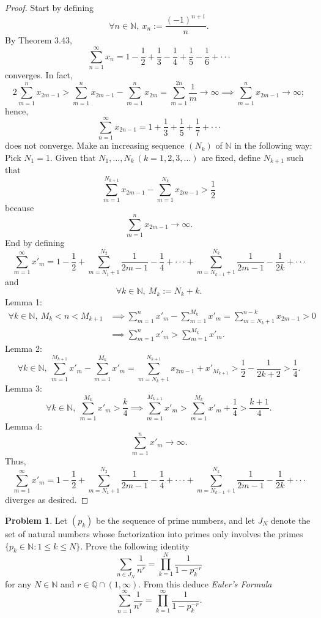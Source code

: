 \documentclass{amsart}
\theoremstyle{definition}
\newtheorem{problem}{Problem}
\begin{document}
\begin{proof}
    Start by defining 
    \[
    \forall n \in \mathbb{N}, \ x_n := \frac{(-1)^{n+1}}{n}.
    \]
    By Theorem 3.43,
    \[
    \sum_{n = 1}^{\infty}x_n = 1 - \frac{1}{2} + \frac{1}{3} - \frac{1}{4} + \frac{1}{5} - \frac{1}{6} + \cdot \cdot \cdot
    \]
    converges. In fact, 
    \[
    2\sum_{m = 1}^{n}x_{2m-1} > \sum_{m = 1}^{n}x_{2m-1} - \sum_{m = 1}^{n}x_{2m} = \sum_{m = 1}^{2n}\frac{1}{m} \to \infty \implies \sum_{m = 1}^{n}x_{2m-1} \to \infty;
    \]
    hence,
    \[
    \sum_{n = 1}^{\infty}x_{2n-1} = 1 + \frac{1}{3} + \frac{1}{5} + \frac{1}{7} + \cdot \cdot \cdot 
    \]
    does not converge. Make an increasing sequence $(N_k)$ of $\mathbb{N}$ in the following way: Pick $N_1 = 1$. Given that $N_1,...,N_k \ (k = 1,2,3,...)$ are fixed, define $N_{k+1}$ such that 
    \[
    \sum_{m = 1}^{N_{k+1}}x_{2m-1} - \sum_{m = 1}^{N_k}x_{2m-1} > \frac{1}{2}
    \]
    because
    \[
    \sum_{m = 1}^{n}x_{2m-1} \to \infty.
    \]
    End by defining
    \[
    \sum_{m = 1}^{\infty}x'_m = 1 - \frac{1}{2} + \sum_{m = N_1 + 1}^{N_2}\frac{1}{2m-1} - \frac{1}{4} + \cdot \cdot \cdot + \sum_{m = N_{k-1} + 1}^{N_k}\frac{1}{2m-1} - \frac{1}{2k} + \cdot \cdot \cdot
    \]
    and 
    \[
    \forall k \in \mathbb{N}, \ M_k := N_k + k.
    \]
    Lemma 1: 
    \begin{align*}
        \forall k \in \mathbb{N}, \ M_k < n < M_{k+1} &\implies
        \sum_{m = 1}^{n}x'_m - \sum_{m = 1}^{M_k}x'_m = \sum_{m = N_k + 1}^{n-k}x_{2m-1} > 0 \\
        &\implies \sum_{m = 1}^{n}x'_m > \sum_{m = 1}^{M_k}x'_m.
    \end{align*}
    Lemma 2:
    \[
    \forall k \in \mathbb{N}, \ \sum_{m = 1}^{M_{k+1}}x'_m - \sum_{m = 1}^{M_k}x'_m = \sum_{m = N_k + 1}^{N_{k+1}}x_{2m-1} + x'_{M_{k+1}} > \frac{1}{2} - \frac{1}{2k + 2} > \frac{1}{4}.
    \]
    Lemma 3:
    \[
    \forall k \in \mathbb{N}, \ \sum_{m = 1}^{M_k}x'_m > \frac{k}{4} \implies \sum_{m = 1}^{M_{k + 1}}x'_m > \sum_{m = 1}^{M_k}x'_m + \frac{1}{4} > \frac{k+1}{4}. 
    \]
    Lemma 4: 
    \[
    \sum_{m = 1}^{n}x'_m \to \infty.
    \]
    Thus,
    \[
    \sum_{m = 1}^{\infty}x'_m = 1 - \frac{1}{2} + \sum_{m = N_1 + 1}^{N_2}\frac{1}{2m-1} - \frac{1}{4} + \cdot \cdot \cdot + \sum_{m = N_{k-1} + 1}^{N_k}\frac{1}{2m-1} - \frac{1}{2k} + \cdot \cdot \cdot
    \]
    diverges as desired.
\end{proof}

\begin{problem}
    Let $(p_k)$ be the sequence of prime numbers, and let $J_N$ denote the set of natural numbers whose factorization into primes only involves the primes $\{p_k \in \mathbb{N} : 1 \leq k \leq N\}$. Prove the following identity
    \[
    \sum_{n \in J_N}\frac{1}{n^r} = \prod_{k=1}^{N}\frac{1}{1-p_k^{-r}}
    \]
    for any $N \in \mathbb{N}$ and $r \in \mathbb{Q} \cap (1,\infty)$. From this deduce \textit{Euler’s Formula}
    \[
    \sum_{n=1}^{\infty}\frac{1}{n^r} = \prod_{k=1}^{\infty}\frac{1}{1-p_k^{-r}}.
    \]
\end{problem}
\end{document}

